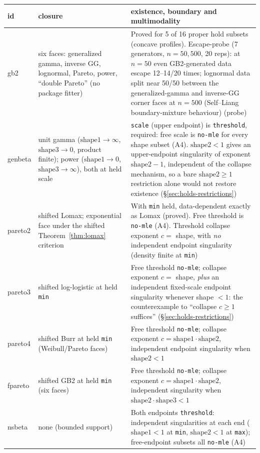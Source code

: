 \documentclass[11pt]{article}
\newcommand{\code}[1]{\texttt{#1}}
\theoremstyle{plain}
\theoremstyle{definition}
\theoremstyle{remark}
\begin{document}
\begin{center}
\small
\begin{tabular}{@{}l p{4.2cm} p{8.2cm}@{}}
\toprule
id & closure & existence, boundary and multimodality \\
\midrule
gb2 & six faces: generalized gamma, inverse GG, lognormal, Pareto, power,
  ``double Pareto'' (no package fitter) &
  Proved for 5 of 16 proper hold subsets (concave profiles). Escape-probe
  (7 generators, $n=50,500$, 20 reps): at $n=50$ even GB2-generated data
  escape 12--14/20 times; lognormal data split near 50/50 between the
  generalized-gamma and inverse-GG corner faces at $n=500$ (Self--Liang
  boundary-mixture behaviour) (probe) \\
genbeta & unit gamma ($\mathrm{shape1}\to\infty$, $\mathrm{shape3}\to0$,
  product finite); power ($\mathrm{shape1}\to0$, $\mathrm{shape3}\to\infty$),
  both at held scale &
  \code{scale} (upper endpoint) is \code{threshold}, required: free scale
  is \code{no-mle} for every shape subset (A4). $\mathrm{shape2}<1$ gives
  an upper-endpoint singularity of exponent $\mathrm{shape2}-1$,
  independent of the collapse mechanism, so a bare
  $\mathrm{shape2}\ge1$ restriction alone would not restore existence
  (\S\ref{sec:holds-restrictions}) \\
pareto2 & shifted Lomax; exponential face under the shifted
  Theorem~\ref{thm:lomax} criterion &
  With \code{min} held, data-dependent exactly as Lomax (proved). Free
  threshold is \code{no-mle} (A4). Threshold collapse exponent $c=$
  shape, with \emph{no} independent endpoint singularity (density finite
  at \code{min}) \\
pareto3 & shifted log-logistic at held \code{min} &
  Free threshold \code{no-mle}; collapse exponent $c=$ shape, \emph{plus}
  an independent fixed-scale endpoint singularity whenever shape $<1$: the
  counterexample to ``collapse $c\ge1$ suffices'' (\S\ref{sec:holds-restrictions}) \\
pareto4 & shifted Burr at held \code{min} (Weibull/Pareto faces) &
  Free threshold \code{no-mle}; collapse exponent
  $c=\mathrm{shape1}\cdot\mathrm{shape2}$, independent endpoint singularity
  when $\mathrm{shape2}<1$ \\
fpareto & shifted GB2 at held \code{min} (six faces) &
  Free threshold \code{no-mle}; collapse exponent
  $c=\mathrm{shape1}\cdot\mathrm{shape2}$, independent singularity when
  $\mathrm{shape2}\cdot\mathrm{shape3}<1$ \\
nsbeta & none (bounded support) &
  Both endpoints \code{threshold}: independent singularities at each end
  ($\mathrm{shape1}<1$ at \code{min}, $\mathrm{shape2}<1$ at \code{max});
  free-endpoint subsets all \code{no-mle} (A4) \\
\bottomrule
\end{tabular}
\end{center}
\end{document}
